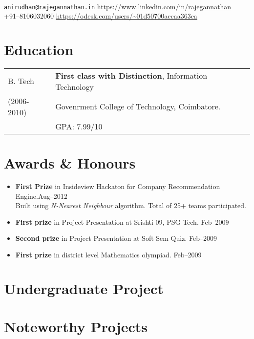 \documentclass{resume}
\begin{document}
\\
{\href{mailto:anirudhan@rajegannathan.in}{\nolinkurl{anirudhan@rajegannathan.in}} \hfill \url{https://www.linkedin.com/in/rajegannathan}}\\
{+91--8106032060 \hfill \url{https://odesk.com/users/~01d50700accaa363ea}}

\section{Education}
\begin{tabular}{>{\centering\arraybackslash}p{1in}l}
  B. Tech & \textbf{First class with Distinction}, Information Technology\\
  \small{(2006-2010)} & Govenrment College of Technology, Coimbatore.\\
    & GPA: 7.99/10
\end{tabular}

\section{Awards \& Honours}
  \begin{itemize}[label={$\ast$}]
    \item \textbf{First Prize} in Insideview Hackaton for Company Recommendation Engine.\hfill Aug--2012\\
      \small{Built using \textit{N-Nearest Neighbour} algorithm.  Total of 25+ teams participated.}
    \item \textbf{First prize} in Project Presentation at Srishti 09, PSG Tech. \hfill Feb--2009\\
    \item \textbf{Second prize} in Project Presentation at Soft Sem Quiz. \hfill Feb--2009\\
    \item \textbf{First prize} in district level Mathematics olympiad. \hfill Feb--2009\\
  \end{itemize}

\section{Undergraduate Project}

\section{Noteworthy Projects}
\end{document}
